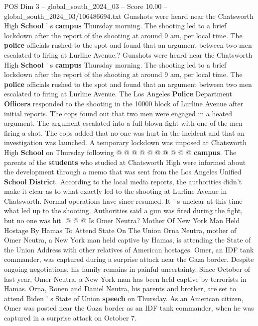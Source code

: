 \begin{textsample}{POS Dim 3 – global\_south\_2024\_03 – Score 10.00 – global\_south\_2024\_03/106486694.txt}  \label{ex:f3_pos_419}
Gunshots were heard near the Chatsworth High \textbf{School} ' s \textbf{campus} Thursday morning.
The shooting led to a brief lockdown after the report of the shooting at around 9 am, per local time.
The \textbf{police} officials rushed to the spot and found that an argument between two men escalated to firing at Lurline Avenue.?
Gunshots were heard near the Chatsworth High \textbf{School} ' s \textbf{campus} Thursday morning.
The shooting led to a brief lockdown after the report of the shooting at around 9 am, per local time.
The \textbf{police} officials rushed to the spot and found that an argument between two men escalated to firing at Lurline Avenue.
The Los Angeles \textbf{Police} Department \textbf{Officers} responded to the shooting in the 10000 block of Lurline Avenue after initial reports.
The cops found out that two men were engaged in a heated argument.
The argument escalated into a full-blown fight with one of the men firing a shot.
The cops added that no one was hurt in the incident and that an investigation was launched.
A temporary lockdown was imposed at Chatsworth High \textbf{School} on Thursday following @ @ @ @ @ @ @ @ @ @ \textbf{campus}.
The parents of the \textbf{students} who studied at Chatsworth High were informed about the development through a memo that was sent from the Los Angeles Unified \textbf{School} \textbf{District}.
According to the local media reports, the authorities didn't make it clear as to what exactly led to the shooting at Lurline Avenue in Chatsworth.
Normal operations have since resumed.
It ' s unclear at this time what led up to the shooting.
Authorities said a gun was fired during the fight, but no one was hit. @ @ @ Is Omer Neutra?
Mother Of New York Man Held Hostage By Hamas To Attend State On The Union Orna Neutra, mother of Omer Neutra, a New York man held captive by Hamas, is attending the State of the Union Address with other relatives of American hostages.
Omer, an IDF tank commander, was captured during a surprise attack near the Gaza border.
Despite ongoing negotiations, his family remains in painful uncertainty.
Since October of last year, Omer Neutra, a New York man has been held captive by terrorists in Hamas.
Orna, Ronen and Daniel Neutra, his parents and brother, are set to attend Biden ' s State of Union \textbf{speech} on Thursday.
As an American citizen, Omer was posted near the Gaza border as an IDF tank commander, when he was captured in a surprise attack on October 7.

\end{textsample}
